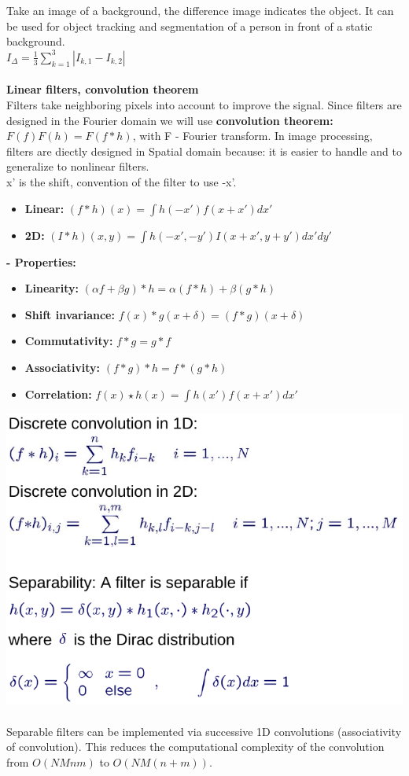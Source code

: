 \documentclass{article}
\begin{document}
Take an image of a background, the difference image indicates the object. It can be used for object tracking and segmentation of a person in front of a static background.\\
$I_\Delta = \frac{1}{3}\sum_{k=1}^3|I_{k,1}-I_{k,2}|$\\\\
\textbf{Linear filters, convolution theorem}\\
Filters take neighboring pixels into account to improve the signal. Since filters are designed in the Fourier domain we will use \textbf{convolution theorem: }$F(f)F(h)=F(f*h)$, with F - Fourier transform. In image processing, filters are diectly designed in Spatial domain because: it is easier to handle and to generalize to nonlinear filters.\\
x' is the shift, convention of the filter to use -x'.
\begin{itemize}
    \item \textbf{Linear:} $(f*h)(x) = \int h(-x')f(x+x')dx'$
    \item \textbf{2D:} $(I*h)(x,y) = \int h(-x',-y')I(x+x',y+y')dx'dy'$
\end{itemize}
\textbf{- Properties: }
\begin{itemize}
    \item \textbf{Linearity: } $(\alpha f+\beta g)*h=\alpha (f*h)+ \beta (g*h)$
    \item \textbf{Shift invariance: }$f(x)*g(x+\delta) = (f*g)(x+\delta)$
    \item \textbf{Commutativity: }$f*g = g*f$
    \item \textbf{Associativity: }$(f*g)*h = f*(g*h)$
    \item \textbf{Correlation: }$f(x)\star h(x) = \int h(x')f(x+x')dx'$
\end{itemize}
\includegraphics[scale=0.35]{19.png}\\\\
Separable filters can be implemented via successive 1D convolutions (associativity of convolution). This reduces the computational complexity of the convolution from $O(NMnm)$ to $O(NM(n+m))$.\\
\end{document}
